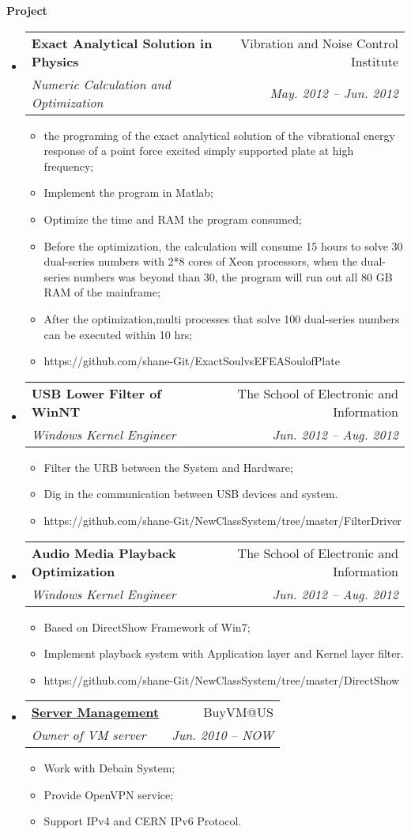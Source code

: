 \documentclass[letterpaper,11pt]{article}
\makeatletter
\newcommand{\resitem}[1]{\item #1 \vspace{-2pt}}
\newcommand{\resheading}[1]{{\large \colorbox{mygrey}{\begin{minipage}{\textwidth}{\textbf{#1 \vphantom{p\^{E}}}}\end{minipage}}}}
\newcommand{\ressubheading}[4]{
\begin{tabular*}{6.5in}{l@{\extracolsep{\fill}}r}
		\textbf{#1} & #2 \\
		\textit{#3} & \textit{#4} \\
\end{tabular*}\vspace{-6pt}}
\makeatother
\begin{document}
\resheading{Project}
	\begin{itemize}
		\item 
			\ressubheading{Exact Analytical Solution in Physics}{Vibration and Noise Control Institute}{Numeric Calculation and Optimization}{May. 2012 -- Jun. 2012}
				{ \footnotesize
				\begin{itemize}
					\resitem{the programing of the exact analytical solution of the vibrational energy response of a point force excited simply supported plate at high frequency;}
					\resitem{Implement the program in Matlab;}
					\resitem{Optimize the time and RAM the program consumed;}
					\resitem{Before the optimization, the calculation will consume 15 hours to solve 30 dual-series numbers with 2*8 cores of Xeon processors, when the dual-series numbers was beyond than 30, the program will run out all 80 GB RAM of the mainframe;}
					\resitem{After the optimization,multi processes that solve 100 dual-series numbers can be executed within 10 hrs;}
					\resitem{https://github.com/shane-Git/ExactSoulvsEFEASoulofPlate}
				\end{itemize}
				}
		\item 
			\ressubheading{USB Lower Filter of WinNT}{The School of Electronic and Information}{Windows Kernel Engineer}{Jun. 2012 -- Aug. 2012}
				{ \footnotesize
				\begin{itemize}
					\resitem{Filter the URB between the System and Hardware;}
					\resitem{Dig in the communication between USB devices and system.}
					\resitem{https://github.com/shane-Git/NewClassSystem/tree/master/FilterDriver}
				\end{itemize}
				}
		\item 
			\ressubheading{Audio Media Playback Optimization}{The School of Electronic and Information}{Windows Kernel Engineer}{Jun. 2012 -- Aug. 2012}
				{ \footnotesize
				\begin{itemize}
					\resitem{Based on DirectShow Framework of Win7;}
					\resitem{Implement playback system with Application layer and Kernel layer filter.}
					\resitem{https://github.com/shane-Git/NewClassSystem/tree/master/DirectShow}
				\end{itemize}
				}
		\item 
			\ressubheading{\href{http://svr6.haohaizi.us/}{Server Management}}{BuyVM@US}{Owner of VM server}{Jun. 2010 -- NOW}
				{ \footnotesize
				\begin{itemize}
					\resitem{Work with Debain System;}
					\resitem{Provide OpenVPN service;}
					\resitem{Support IPv4 and CERN IPv6 Protocol.}

\end{itemize}}
\end{itemize}
\end{document}
